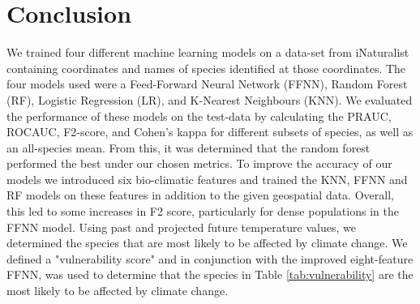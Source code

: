 \section{Conclusion}
We trained four different machine learning models on a data-set from iNaturalist containing coordinates and names of species identified at those coordinates. The four models used were a Feed-Forward Neural Network (FFNN), Random Forest (RF), Logistic Regression (LR), and K-Nearest Neighbours (KNN). We evaluated the performance of these models on the test-data by calculating the PRAUC, ROCAUC, F2-score, and Cohen's kappa for different subsets of species, as well as an all-species mean. From this, it was determined that the random forest performed the best under our chosen metrics.
To improve the accuracy of our models we introduced six bio-climatic features and trained the KNN, FFNN and RF models on these features in addition to the given geospatial data. Overall, this led to some increases in F2 score, particularly for dense populations in the FFNN model. Using past and projected future temperature values, we determined the species that are most likely to be affected by climate change. We defined a "vulnerability score" and in conjunction with the improved eight-feature FFNN, was used to determine that the species in Table \ref{tab:vulnerability} are the most likely to be affected by climate change.


